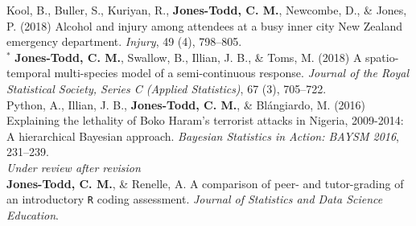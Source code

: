 \documentclass[10pt,a4paper]{moderncv}
\begin{document}
\vspace{-3pt}
Kool, B., Buller, S., Kuriyan, R., \textbf{Jones-Todd, C. M.}, Newcombe, D., \& Jones, P. (2018) Alcohol and injury among attendees at a busy inner city New Zealand emergency department. \textit{Injury}, 49 (4), 798--805.\\


  ${}^\ast$ \textbf{Jones-Todd, C. M.}, Swallow, B., Illian, J. B., \& Toms, M. (2018) A spatio-temporal multi-species model of a semi-continuous response. \textit{Journal of the Royal Statistical Society, Series C (Applied Statistics)}, 67 (3), 705--722.\\

\vspace{-3pt}
Python, A.,  Illian, J. B., \textbf{Jones-Todd, C. M.}, \& Bl\'{a}ngiardo, M. (2016) Explaining the lethality of Boko Haram’s terrorist attacks in Nigeria, 2009-2014: A hierarchical Bayesian approach. \textit{Bayesian Statistics in Action: BAYSM 2016}, 231--239.\\


\textit{\small{Under review after revision}}\\

 \textbf{Jones-Todd, C. M.}, \& Renelle, A. A comparison of peer- and tutor-grading of an introductory \texttt{R} coding assessment. \textit{Journal of Statistics and Data Science Education}.\\







\end{document}
